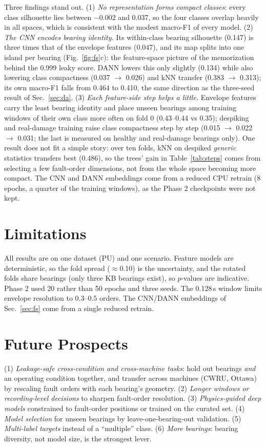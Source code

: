 \documentclass[conference]{IEEEtran}
\newcommand{\mF}{macro-F1}
\begin{document}
Three findings stand out. (1) \emph{No representation forms compact classes}: every class
silhouette lies between $-0.002$ and 0.037, so the four classes overlap heavily in all spaces,
which is consistent with the modest \mF{} of every model. (2) \emph{The CNN encodes bearing
identity.} Its within-class bearing silhouette (0.147) is three times that of the envelope
features (0.047), and its map splits into one island per bearing (Fig.~\ref{fig:fs}c): the
feature-space picture of the memorization behind the 0.999 leaky score. DANN lowers this only
slightly (0.134) while also lowering class compactness (0.037 $\rightarrow$ 0.026) and kNN
transfer (0.383 $\rightarrow$ 0.313); its own \mF{} falls from 0.464 to 0.410, the same direction
as the three-seed result of Sec.~\ref{sec:da}. (3) \emph{Each feature-side step helps a
little.} Envelope features carry the least bearing identity and place unseen bearings among
training windows of their own class more often on fold 0 (0.43--0.44 vs 0.35); despiking and
real-damage training raise class compactness step by step (0.015 $\rightarrow$ 0.022
$\rightarrow$ 0.031; the last is measured on healthy and real-damage bearings only). One result does not fit a simple story: over ten folds, kNN on despiked
\emph{generic} statistics transfers best (0.486), so the trees' gain in Table~\ref{tab:steps}
comes from selecting a few fault-order dimensions, not from the whole space becoming more
compact. The CNN and DANN embeddings come from a reduced CPU retrain (8 epochs, a quarter of
the training windows), as the Phase 2 checkpoints were not kept.

\section{Limitations}
All results are on one dataset (PU) and one scenario.
Feature models are deterministic, so the fold spread ($\approx$0.10) is the uncertainty, and the
rotated folds share bearings (only three KB bearings exist), so $p$-values are indicative. Phase 2
used 20 rather than 50 epochs and three seeds. The 0.128\,s window limits envelope resolution to
0.3--0.5 orders. The CNN/DANN embeddings of Sec.~\ref{sec:fs} come from a single reduced retrain.

\section{Future Prospects}\label{sec:future}
(1) \emph{Leakage-safe cross-condition and cross-machine tasks}: hold out bearings \emph{and} an
operating condition together, and transfer across machines (CWRU, Ottawa) by rescaling fault
orders with each bearing's geometry. (2) \emph{Longer windows or recording-level decisions} to
sharpen fault-order resolution. (3) \emph{Physics-guided deep models} constrained to fault-order
positions or trained on the curated set. (4) \emph{Model selection} for unseen bearings by
leave-one-bearing-out validation. (5) \emph{Multi-label targets} \cite{vieira2026} instead of a
``multiple'' class. (6) \emph{More bearings}: bearing diversity, not model size, is the
strongest lever.
\end{document}

